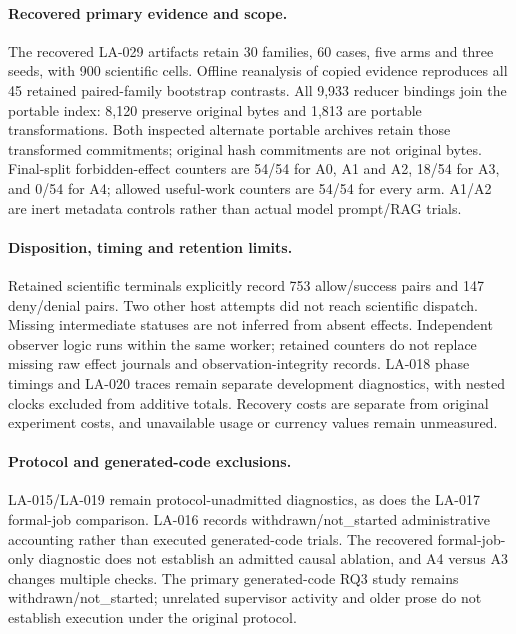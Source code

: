 \paragraph{Recovered primary evidence and scope.}
The recovered LA-029 artifacts retain 30 families, 60 cases, five arms and
three seeds, with 900 scientific cells. Offline reanalysis of copied evidence
reproduces all 45 retained paired-family bootstrap contrasts. All 9,933 reducer
bindings join the portable index: 8,120 preserve original bytes and 1,813 are
portable transformations. Both inspected alternate portable archives retain
those transformed commitments; original hash commitments are not original bytes.
Final-split forbidden-effect counters are 54/54 for A0, A1 and A2, 18/54 for
A3, and 0/54 for A4; allowed useful-work counters are 54/54 for every arm.
A1/A2 are inert metadata controls rather than actual model prompt/RAG trials.

\paragraph{Disposition, timing and retention limits.}
Retained scientific terminals explicitly record 753 allow/success pairs and
147 deny/denial pairs. Two other host attempts did not reach scientific dispatch.
Missing intermediate statuses are not inferred from absent effects. Independent
observer logic runs within the same worker; retained counters do not replace
missing raw effect journals and observation-integrity records. LA-018 phase
timings and LA-020 traces remain separate development diagnostics, with nested
clocks excluded from additive totals. Recovery costs are separate from original
experiment costs, and unavailable usage or currency values remain unmeasured.

\paragraph{Protocol and generated-code exclusions.}
LA-015/LA-019 remain protocol-unadmitted diagnostics, as does the LA-017
formal-job comparison. LA-016 records withdrawn/not\_started administrative
accounting rather than executed generated-code trials. The recovered
formal-job-only diagnostic does not establish an admitted causal
ablation, and A4 versus A3 changes multiple checks. The primary generated-code
RQ3 study remains withdrawn/not\_started; unrelated supervisor activity and
older prose do not establish execution under the original protocol.

